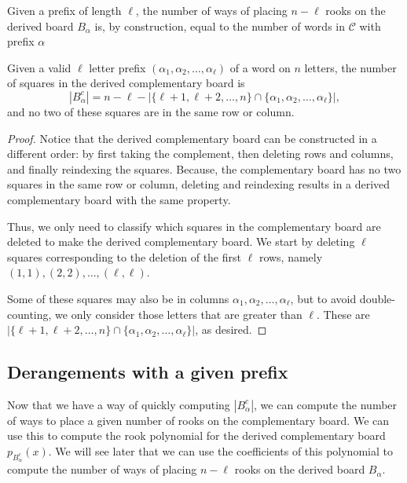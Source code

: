Given a prefix of length $\ell$, the number of ways of placing $n - \ell$ rooks
on the derived board $B_\alpha$ is, by construction,
equal to the number of words in $\mathcal{C}$ with prefix $\alpha$
\begin{lemma}
  Given a valid $\ell$ letter prefix $(\alpha_1, \alpha_2, \dots, \alpha_\ell)$
  of a word on $n$ letters,
  the number of squares in the derived complementary board is \begin{equation}
    |B_\alpha^c| = n - \ell - |\{\ell+1, \ell+2, \dots, n\} \cap \{\alpha_1, \alpha_2, \dots, \alpha_\ell\}|,
  \end{equation} and no two of these squares are in the same row or column.
  \label{lemma:derangementComplementSize}
\end{lemma}
\begin{proof}
  Notice that the derived complementary board can be constructed in a different
  order: by first taking the complement, then deleting rows and columns, and
  finally reindexing the squares.
  Because, the complementary board has no two squares in the same row or column,
  deleting and reindexing results in a derived complementary board with the same
  property.

  Thus, we only need to classify which squares in the complementary board are
  deleted to make the derived complementary board.
  We start by deleting $\ell$ squares corresponding to the deletion of the first
  $\ell$ rows, namely $(1, 1), (2, 2), \dots, (\ell, \ell)$.

  Some of these squares may also be in columns
  $\alpha_1, \alpha_2, \dots, \alpha_\ell$, but to avoid double-counting, we
  only consider those letters that are greater than $\ell$. These are
  $|\{\ell+1, \ell+2, \dots, n\} \cap \{\alpha_1, \alpha_2, \dots, \alpha_\ell\}|$,
  as desired.
\end{proof}

\subsection{Derangements with a given prefix}
Now that we have a way of quickly computing $|B_\alpha^c|$, we can compute the
number of ways to place a given number of rooks on the complementary board.
We can use this
to compute the rook polynomial for the derived complementary board
$p_{B_\alpha^c}(x)$.
We will see later that we can use the coefficients of this polynomial to compute
the number of ways of placing $n - \ell$ rooks on the derived board $B_\alpha$.

